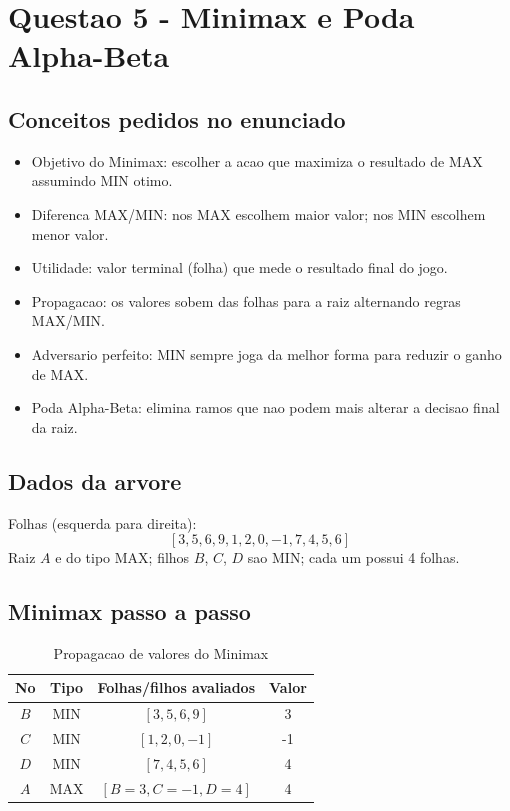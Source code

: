 \section{Questao 5 - Minimax e Poda Alpha-Beta}

\subsection{Conceitos pedidos no enunciado}
\begin{itemize}[leftmargin=1.5em]
  \item Objetivo do Minimax: escolher a acao que maximiza o resultado de MAX assumindo MIN otimo.
  \item Diferenca MAX/MIN: nos MAX escolhem maior valor; nos MIN escolhem menor valor.
  \item Utilidade: valor terminal (folha) que mede o resultado final do jogo.
  \item Propagacao: os valores sobem das folhas para a raiz alternando regras MAX/MIN.
  \item Adversario perfeito: MIN sempre joga da melhor forma para reduzir o ganho de MAX.
  \item Poda Alpha-Beta: elimina ramos que nao podem mais alterar a decisao final da raiz.
\end{itemize}

\subsection{Dados da arvore}
Folhas (esquerda para direita):
\[
[3,5,6,9,1,2,0,-1,7,4,5,6]
\]
Raiz $A$ e do tipo MAX; filhos $B$, $C$, $D$ sao MIN; cada um possui 4 folhas.

\subsection{Minimax passo a passo}
\begin{table}[H]
\centering
\begin{tabular}{c c c c}
\toprule
No & Tipo & Folhas/filhos avaliados & Valor \\
\midrule
$B$ & MIN & $[3,5,6,9]$ & 3 \\
$C$ & MIN & $[1,2,0,-1]$ & -1 \\
$D$ & MIN & $[7,4,5,6]$ & 4 \\
$A$ & MAX & $[B=3,C=-1,D=4]$ & 4 \\
\bottomrule
\end{tabular}
\caption{Propagacao de valores do Minimax}
\end{table}

